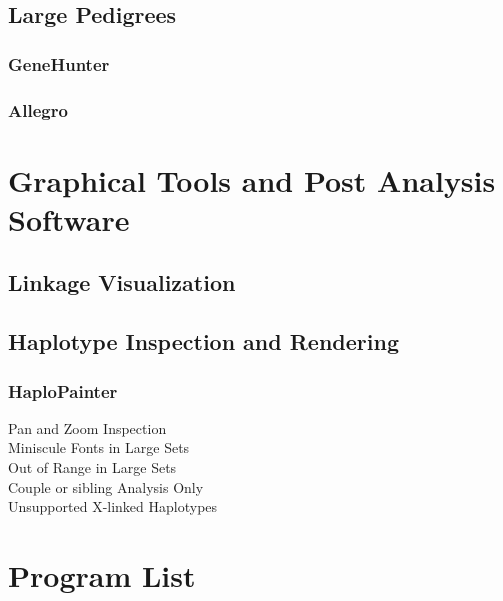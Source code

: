 \subsection{Large Pedigrees}
\subsubsection{GeneHunter}
\subsubsection{Allegro}


\section{Graphical Tools and Post Analysis Software}
\subsection{Linkage Visualization}
\subsection{Haplotype Inspection and Rendering}
\subsubsection{HaploPainter}
\begin{description}
\item[Pan and Zoom Inspection]{}
\item[Miniscule Fonts in Large Sets]{}
\item[Out of Range in Large Sets]{}
\item[Couple or sibling Analysis Only]{}
\item[Unsupported X-linked Haplotypes]{}
\end{description}

\section{Program List}
